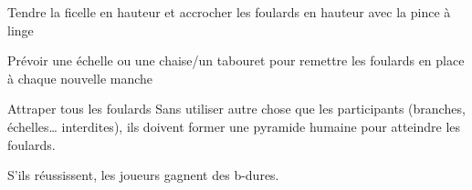 \documentclass{grand-jeu}
\begin{document}
\begin{liste-materiel}
\end{liste-materiel}

\begin{installation}
Tendre la ficelle en hauteur et accrocher les foulards en hauteur avec la pince à linge

Prévoir une échelle ou une chaise/un tabouret pour remettre les foulards en place à chaque nouvelle manche 
\end{installation}

\begin{regles}
Attraper tous les foulards
Sans utiliser autre chose que les participants (branches, échelles… interdites), ils doivent former une pyramide humaine pour atteindre les foulards.

S'ils réussissent, les joueurs gagnent des b-dures. 
\end{regles}

\begin{imaginaire}

\end{imaginaire}

\begin{moments-stop}
\end{moments-stop}
\end{document}
